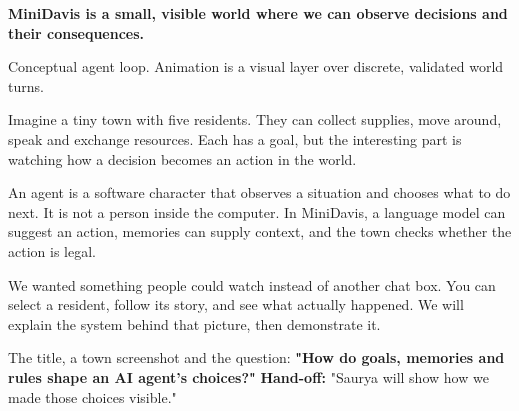 \documentclass[11pt,a4paper]{article}
\newcommand{\pagehead}[3]{\clearpage{\color{forest}\small\ttfamily #1 \hfill #3}\par\vspace{3pt}{\LARGE\bfseries #2}\par\vspace{5pt}}
\newcommand{\subhead}[1]{\par\vspace{7pt}\noindent{\large\bfseries\color{forest}#1}\par\nobreak\vspace{2pt}}
\newcommand{\keyline}[1]{\begin{tcolorbox}[colback=ink,colframe=ink,arc=2mm,boxrule=0pt,left=4mm,right=4mm,top=3mm,bottom=3mm]\color{white}\bfseries #1\end{tcolorbox}}
\newcommand{\captiontext}[1]{{\footnotesize\color{muted}#1\par}}
\newcommand{\handoff}[1]{\vfill{\small\color{forest}\textbf{Hand-off:} #1}\par}
\begin{document}
\pagehead{OPENING}{Start with the town, not the stack}{Eric / host}
\label{opening}
\keyline{MiniDavis is a small, visible world where we can observe decisions and their consequences.}
\begin{center}
\end{center}
\captiontext{Conceptual agent loop. Animation is a visual layer over discrete, validated world turns.}
\begin{saybox}
Imagine a tiny town with five residents. They can collect supplies, move around, speak and exchange resources. Each has a goal, but the interesting part is watching how a decision becomes an action in the world.

An agent is a software character that observes a situation and chooses what to do next. It is not a person inside the computer. In MiniDavis, a language model can suggest an action, memories can supply context, and the town checks whether the action is legal.

We wanted something people could watch instead of another chat box. You can select a resident, follow its story, and see what actually happened. We will explain the system behind that picture, then demonstrate it.
\end{saybox}
\subhead{Opening slide idea}
The title, a town screenshot and the question: \textbf{"How do goals, memories and rules shape an AI agent's choices?"}
\handoff{"Saurya will show how we made those choices visible."}
\end{document}
